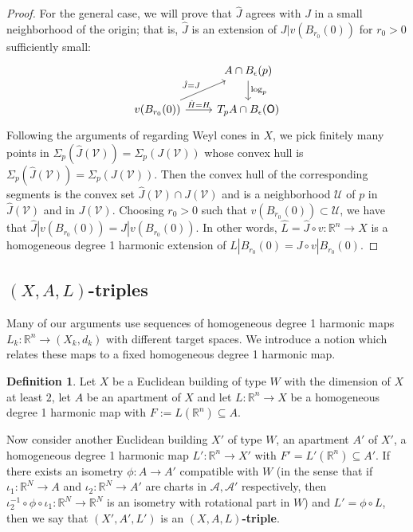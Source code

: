\documentclass[12pt]{amsart}
\theoremstyle{definition}
\newtheorem{definition}[theorem]{Definition}
\numberwithin{equation}{section}
\newcommand{\R}{\mathbb R}
\begin{document}
\begin{proof}
For the general case, we will prove that $\hat J$ agrees with $J$ in a small neighborhood of the origin; that is, $\hat J$ is an extension of $J|v(B_{r_0}(0))$ for $r_0>0$ sufficiently small:
\begin{equation*}
\begin{tikzcd}
    &  A \cap B_\epsilon(p) \arrow[d, "\log_{p}" ] \\
 v(B_{r_0}(0))  \arrow[ur, "\hat J=J"] \arrow[r, "\hat H=H" ]
& T_pA \cap B_\epsilon(\mathsf O) \end{tikzcd}
\end{equation*}
Following the arguments of   \cite[Section 4.4]{kleiner-leeb} regarding Weyl cones in $X$, we pick finitely many points in $\Sigma_p(\hat J(\mathscr V)) = \Sigma_p(J(\mathscr V))$ whose convex hull is $\Sigma_p(\hat J(\mathscr V)) = \Sigma_p(J(\mathscr V))$.  Then the convex hull of the corresponding segments is the convex set $\hat J(\mathscr V) \cap J(\mathscr V)$ and is a neighborhood $\mathscr U$ of $p$ in $\hat J(\mathscr V)$ and in $J(\mathscr V)$. 
Choosing $r_0>0$ such that  $v(B_{r_0}(0)) \subset \mathscr U$, we have that $\hat J|v(B_{r_0}(0))=J|v(B_{r_0}(0))$.  In other words, $\hat L=\hat J \circ v:\R^n \to X$ is a homogeneous degree 1 harmonic extension of $L|B_{r_0}(0)=J \circ v|B_{r_0}(0)$.
  \end{proof}



\subsection{$(X,A,L)$-triples}
Many of our arguments use sequences of homogeneous degree 1 harmonic maps $L_k: \R^n \to (X_k, d_k)$ with different target spaces.  We introduce a notion which relates these maps to a fixed homogeneous degree 1 harmonic map. \begin{definition}\label{def:triple}
Let $X$ be a Euclidean building of type $W$ with the dimension of $X$ at least $2$, let $A$ be an apartment of $X$ and let $L:\R^n\to X$ be a homogeneous degree 1 harmonic map with $F:=L(\R^n) \subseteq A$.

Now consider another Euclidean building $X'$ of type $W$, an apartment $A'$ of $X'$, a homogeneous degree 1 harmonic map $L':\R^n \to X'$  with $F' = L'(\R^n)\subseteq A'$. If there exists an isometry $\phi:A\to A'$ compatible with $W$ (in the sense that if $\iota_1:\R^N \rightarrow A$ and $\iota_2:\R^N \rightarrow A'$ are charts in $\mathcal A, \mathcal A'$ respectively, then $\iota_2^{-1}\circ\phi\circ\iota_1:\R^N\to\R^N$ is an isometry with rotational part in $W$) and $L'=\phi\circ L$, then we say that $(X',A',L')$ is an {\bf $(X,A,L)$-triple}.
\end{definition}
\end{document}
